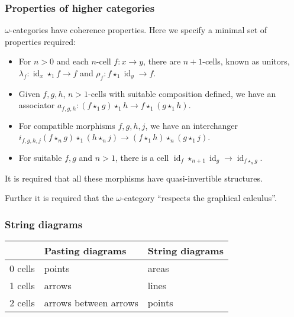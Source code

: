 \documentclass[presentation]{beamer}
\DeclareMathOperator{\id}{id}
\newcommand{\inv}[1]{#1^{-1}}
\newcommand{\comp}{\star}
\begin{document}
\begin{frame}
  \frametitle{Properties of higher categories}

  \(\omega\)-categories have coherence properties. Here we specify a minimal set of properties required:
  \begin{itemize}
  \item For \(n>0\) and each \(n\)-cell \(f: x \to y\), there are \(n+1\)-cells, known as unitors, \(\lambda_f: \id_x \comp_1 f \to f\) and \(\rho_f: f \comp_1 \id_y \to f\).
  \item Given \(f,g,h\), \(n>1\)-cells with suitable composition defined, we have an associator \(a_{f,g,h} : (f \comp_1 g) \comp_1 h \to f \comp_1 (g \comp_1 h)\).
  \item For compatible morphisms \(f,g,h,j\), we have an interchanger \(i_{f,g,h,j}(f \comp_n g) \comp_1 (h \comp_n j) \to (f \comp_1 h) \comp_n (g \comp_1 j)\).
  \item For suitable \(f,g\) and \(n > 1\), there is a cell \(\id_f \comp_{n+1} \id_g \to \id_{f \comp_n g}\).
  \end{itemize}
  \pause{}
  It is required that all these morphisms have quasi-invertible structures.

  \pause{}
  Further it is required that the \(\omega\)-category ``respects the graphical calculus''.
\end{frame}

\begin{frame}[fragile]
  \frametitle{String diagrams}
  \begin{table}[]
    \begin{tabular}{lll}
      & Pasting diagrams      & String diagrams \\
      \hline
      0 cells & points                & areas           \\
      1 cells & arrows                & lines           \\
      2 cells & arrows between arrows & points
    \end{tabular}
  \end{table}
  \pause{}
  \begin{center}
  \end{center}
\end{frame}
\end{document}
